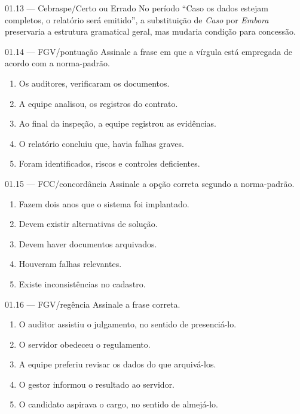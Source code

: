 \begin{questao}{ 01.13 — Cebraspe/Certo ou Errado}
No período ``Caso os dados estejam completos, o relatório será emitido'', a substituição de \emph{Caso} por \emph{Embora} preservaria a estrutura gramatical geral, mas mudaria condição para concessão.
\end{questao}

\begin{questao}{ 01.14 — FGV/pontuação}
Assinale a frase em que a vírgula está empregada de acordo com a norma-padrão.
\begin{enumerate}[label=\Alph*)]
\item Os auditores, verificaram os documentos.
\item A equipe analisou, os registros do contrato.
\item Ao final da inspeção, a equipe registrou as evidências.
\item O relatório concluiu que, havia falhas graves.
\item Foram identificados, riscos e controles deficientes.
\end{enumerate}
\end{questao}

\begin{questao}{ 01.15 — FCC/concordância}
Assinale a opção correta segundo a norma-padrão.
\begin{enumerate}[label=\Alph*)]
\item Fazem dois anos que o sistema foi implantado.
\item Devem existir alternativas de solução.
\item Devem haver documentos arquivados.
\item Houveram falhas relevantes.
\item Existe inconsistências no cadastro.
\end{enumerate}
\end{questao}

\begin{questao}{ 01.16 — FGV/regência}
Assinale a frase correta.
\begin{enumerate}[label=\Alph*)]
\item O auditor assistiu o julgamento, no sentido de presenciá-lo.
\item O servidor obedeceu o regulamento.
\item A equipe preferiu revisar os dados do que arquivá-los.
\item O gestor informou o resultado ao servidor.
\item O candidato aspirava o cargo, no sentido de almejá-lo.
\end{enumerate}
\end{questao}

